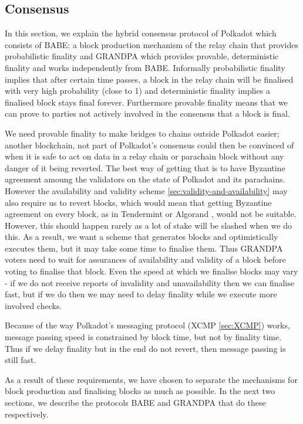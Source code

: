 \subsection{Consensus}\label{sec:consensus}

In this section, we explain the hybrid consensus protocol of Polkadot which consists of BABE: a block production mechanism of the relay chain that provides probabilistic finality and GRANDPA which provides provable, deterministic finality and works independently from BABE.  Informally probabilistic finality implies that after certain time passes, a block in the relay chain will be finalised with very high probability (close to 1) and deterministic finality implies a finalised block stays final forever. Furthermore provable finality means that we can prove to parties not actively involved in the consensus that a block is final.

We need provable finality to make bridges to chains outside Polkadot easier; another blockchain, not part of Polkadot's consensus could then be convinced of when it is safe to act on data in a relay chain or parachain block without any danger of it being reverted. The best way of getting that is to have Byzantine agreement amoung the validators on the state of Polkadot and its parachains. However the availability and validity scheme \ref{sec:validity-and-availability} may also require us to revert blocks, which would mean that getting Byzantine agreement on every block, as in Tendermint \cite{Tendermint} or Algorand \cite{ALGORAND}, would not be suitable. However, this should happen rarely as a lot of stake will be slashed when we do this. As a result, we want a scheme that generates blocks and optimistically executes them, but it may take some time to finalise them. Thus GRANDPA voters need to wait for assurances of availability and validity of a block before voting to finalise that block.
Even the speed at which we finalise blocks may vary - if we do not receive reports of invalidity and unavailability then we can finalise fast, but if we do then we may need to delay finality while we execute more involved checks. 

Because of the way Polkadot's messaging protocol (XCMP \ref{sec:XCMP}) works, message passing speed is constrained by block time, but not by finality time. Thus if we delay finality but in the end do not revert, then message passing is still fast.

As a result of these requirements, we have chosen to separate the mechanisms for block production and finalising blocks as much as possible. In the next two sections, we describe the protocols BABE and GRANDPA that do these respectively.

